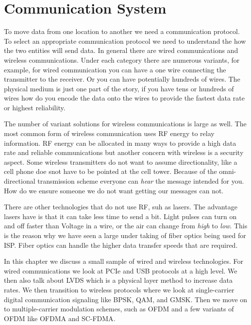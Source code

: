 \chapter{Communication System}

To move data from one location to another we need a communication protocol. To select an appropriate communication protocol we need to understand the how the two entities will send data. In general there are wired communications and wireless communications. Under each category there are numerous variants, for example, for wired communication you can have a one wire connecting the transmitter to the receiver. Or you can have potentially hundreds of wires. The physical medium is just one part of the story, if you have tens or hundreds of wires how do you encode the data onto the wires to provide the fastest data rate or highest reliability.	

The number of variant solutions for wireless communications is large as well. The most common form of wireless communication uses \ac{RF} energy to relay information. \ac{RF} energy can be allocated in many ways to provide a high data rate and reliable communications but another concern with wireless is a security aspect. Some wireless transmitters do not want to assume directionality, like a cell phone doe snot have to be pointed at the cell tower. Because of the omni-directional transmission scheme everyone can \emph{hear} the message intended for you. How do we ensure someone we do not want getting our messages can not.

There are other technologies that do not use \ac{RF}, suh as lasers. The advantage lasers have is that it can take less time to send a bit. Light pulses can turn on and off faster than Voltage in a wire, or the air can change from \emph{high} to \emph{low}. This is the reason why we have seen a large under taking of fiber optics being used for \ac{ISP}. Fiber optics can handle the higher data transfer speeds that are required.

In this chapter we discuss a small sample of wired and wireless technologies. For wired communications we look at \ac{PCIe} and \ac{USB} protocols at a high level. We then also talk about \ac{LVDS} which is a physical layer method to increase data rates. We then transition to wireless protocols where we look at single-carrier digital communication signaling like \ac{BPSK}, \ac{QAM}, and \ac{GMSK}. Then we move on to multiple-carrier modulation schemes, such as \ac{OFDM} and a few variants of \ac{OFDM} like \ac{OFDMA} and \ac{SC-FDMA}.


